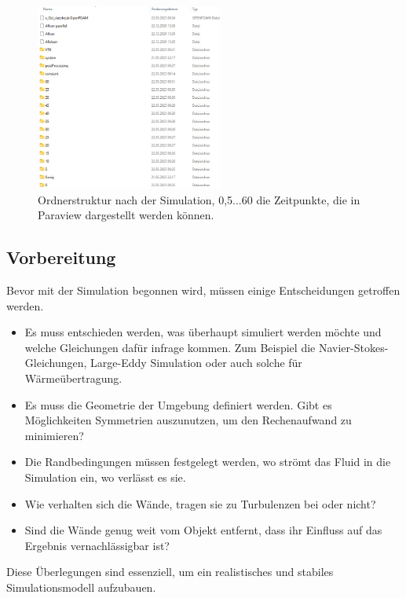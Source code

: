\begin{figure}
    \centering
    \includegraphics[width=0.55\textwidth]{papers/openfoam/Bilder/Ordnerstruktur_Simuliert.jpg}
    \caption{Ordnerstruktur nach der Simulation, 0,5...60 die Zeitpunkte, die in Paraview dargestellt werden können.}
    \label{fig:ordStrktSim}
\end{figure}

\subsection{Vorbereitung \label{openfoam:section:Vorbereitung}}
Bevor mit der Simulation begonnen wird, müssen einige Entscheidungen getroffen werden.
\begin{itemize}
    \item Es muss entschieden werden, was überhaupt simuliert werden möchte und welche Gleichungen dafür infrage kommen.
    Zum Beispiel die Navier-Stokes-Gleichungen, Large-Eddy Simulation oder auch solche für Wärmeübertragung.
    \item Es muss die Geometrie der Umgebung definiert werden. 
    Gibt es Möglichkeiten Symmetrien auszunutzen, um den Rechenaufwand zu minimieren?
    \item Die Randbedingungen müssen festgelegt werden, wo strömt das Fluid in die Simulation ein, wo verlässt es sie.
    \item Wie verhalten sich die Wände, tragen sie zu Turbulenzen bei oder nicht?
    \item Sind die Wände genug weit vom Objekt entfernt, dass ihr Einfluss auf das Ergebnis vernachlässigbar ist?
\end{itemize} 
Diese Überlegungen sind essenziell, um ein realistisches und stabiles Simulationsmodell aufzubauen.

